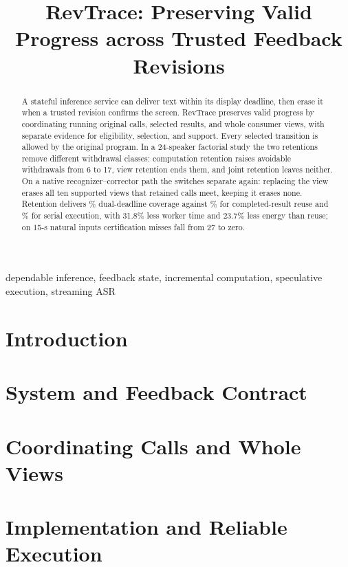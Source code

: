 \documentclass[conference,10pt]{IEEEtran}
\begin{document}
\title{RevTrace: Preserving Valid Progress across Trusted Feedback Revisions}
\author{}
\maketitle
\begin{abstract}
A stateful inference service can deliver text within its display deadline,
then erase it when a trusted revision confirms the screen. RevTrace
preserves valid progress by coordinating running original
calls, selected results, and whole consumer views, with separate evidence
for eligibility, selection, and support. Every selected transition is
allowed by the original program. In a 24-speaker factorial study the two
retentions remove different withdrawal classes: computation retention
raises avoidable withdrawals from 6 to 17, view retention ends them, and
joint retention leaves neither. On a native recognizer--corrector path
the switches separate again: replacing the view erases all ten supported
views that retained calls meet, keeping it erases none. Retention
delivers \NativeFullCreditPct\% dual-deadline coverage against
\NativeReadyCreditPct\% for completed-result reuse and
\NativeConsCreditPct\% for serial execution, with 31.8\% less worker
time and 23.7\% less energy than reuse; on 15-s natural inputs
certification misses fall from 27 to zero.
\end{abstract}
\begin{IEEEkeywords}
dependable inference, feedback state, incremental computation, speculative execution, streaming ASR
\end{IEEEkeywords}
\section{Introduction}\label{sec:intro}

\section{System and Feedback Contract}\label{sec:contract}

\section{Coordinating Calls and Whole Views}\label{sec:continuation}

\section{Implementation and Reliable Execution}\label{sec:protocol}

\end{document}
